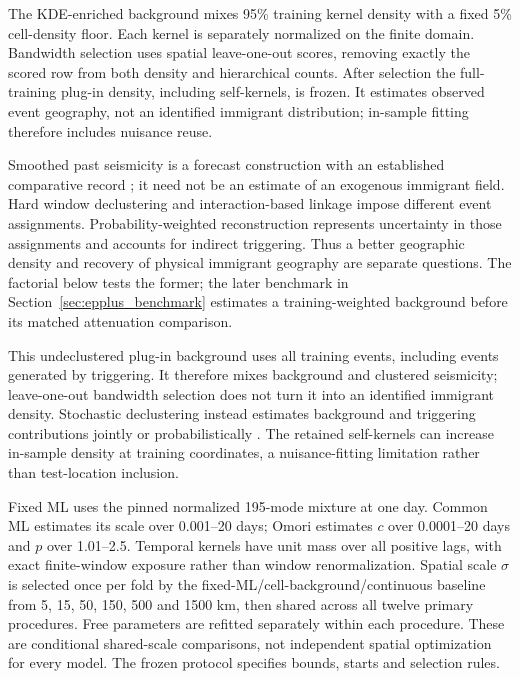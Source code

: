 The KDE-enriched background mixes 95\% training kernel density with a fixed 5\% cell-density floor. Each kernel is separately normalized on the finite domain. Bandwidth selection uses spatial leave-one-out scores, removing exactly the scored row from both density and hierarchical counts. After selection the full-training plug-in density, including self-kernels, is frozen. It estimates observed event geography, not an identified immigrant distribution; in-sample fitting therefore includes nuisance reuse.

Smoothed past seismicity is a forecast construction with an established
comparative record \citep{HelmstetterKaganJackson2006,WernerEtAl2011}; it need
not be an estimate of an exogenous immigrant field. Hard window declustering
\citep{GardnerKnopoff1974} and interaction-based linkage
\citep{Reasenberg1985} impose different event assignments. Probability-weighted
reconstruction \citep{ZhuangOgataVereJones2002,MarsanLengline2008} represents
uncertainty in those assignments and accounts for indirect triggering. Thus a
better geographic density and recovery of physical immigrant geography are
separate questions. The factorial below tests the former; the later benchmark
in Section~\ref{sec:epplus_benchmark} estimates a training-weighted background
before its matched attenuation comparison.

This undeclustered plug-in background uses all training events, including events generated by triggering. It therefore mixes background and clustered seismicity; leave-one-out bandwidth selection does not turn it into an identified immigrant density. Stochastic declustering instead estimates background and triggering contributions jointly or probabilistically \citep{ZhuangOgataVereJones2002}. The retained self-kernels can increase in-sample density at training coordinates, a nuisance-fitting limitation rather than test-location inclusion.

Fixed ML uses the pinned normalized 195-mode mixture at one day. Common ML estimates its scale over 0.001--20 days; Omori estimates $c$ over 0.0001--20 days and $p$ over 1.01--2.5. Temporal kernels have unit mass over all positive lags, with exact finite-window exposure rather than window renormalization. Spatial scale $\sigma$ is selected once per fold by the fixed-ML/cell-background/continuous baseline from 5, 15, 50, 150, 500 and 1500 km, then shared across all twelve primary procedures. Free parameters are refitted separately within each procedure. These are conditional shared-scale comparisons, not independent spatial optimization for every model. The frozen protocol specifies bounds, starts and selection rules.

